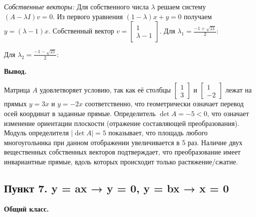 \documentclass[a4paper,14pt]{extarticle}
\begin{document}
\emph{Собственные векторы:} Для собственного числа \(\lambda\) решаем
систему \((A - \lambda I)v = 0\). Из первого уравнения
\((1 - \lambda)x + y = 0\) получаем \(y = (\lambda - 1)x\). Собственный
вектор \(v = \begin{bmatrix} 1 \\ \lambda - 1 \end{bmatrix}\). Для
\(\lambda_1 = \frac{-1 + \sqrt{21}}{2}\):
\begin{center}\end{center}
Для \(\lambda_2 = \frac{-1 - \sqrt{21}}{2}\):
\begin{center}\end{center}

\textbf{Вывод.}

Матрица \(A\) удовлетворяет условию, так как её столбцы
\(\begin{bmatrix} 1 \\ 3 \end{bmatrix}\) и
\(\begin{bmatrix} 1 \\ -2 \end{bmatrix}\) лежат на прямых \(y = 3x\) и
\(y = -2x\) соответственно, что геометрически означает перевод осей
координат в заданные прямые. Определитель \(\det A = -5 < 0\), что
означает изменение ориентации плоскости (отражение составляющей
преобразования). Модуль определителя \(|\det A| = 5\) показывает, что
площадь любого многоугольника при данном отображении увеличивается в 5
раз. Наличие двух вещественных собственных векторов подтверждает, что
преобразование имеет инвариантные прямые, вдоль которых происходит
только растяжение/сжатие.

\hypertarget{ux43fux443ux43dux43aux442-7.-y-ax-y-0-y-bx-x-0}{%
\subsection{Пункт 7. y = ax → y = 0, y = bx → x =
0}\label{ux43fux443ux43dux43aux442-7.-y-ax-y-0-y-bx-x-0}}

\textbf{Общий класс.}
\end{document}
